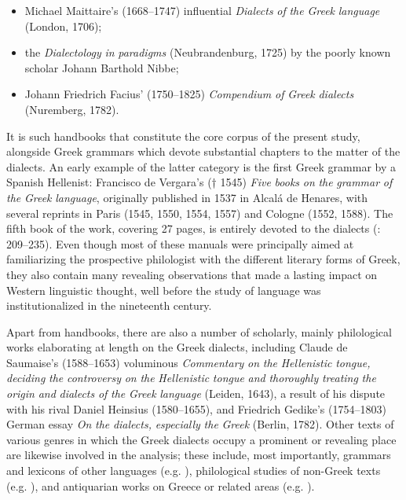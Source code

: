 \begin{itemize}
\begin{styleListParagraph}
\end{styleListParagraph}
\item \begin{styleListParagraph}
Michael Maittaire’s (1668–1747) influential \textit{Dialects} \textit{of} \textit{the} \textit{Greek} \textit{language} (London, 1706);
\end{styleListParagraph}
\item \begin{styleListParagraph}
the \textit{Dialectology} \textit{in} \textit{paradigms} (Neubrandenburg, 1725) by the poorly known scholar Johann Barthold Nibbe;
\end{styleListParagraph}
\item \begin{styleListParagraph}
Johann Friedrich Facius’ (1750–1825) \textit{Compendium} \textit{of} \textit{Greek} \textit{dialects} (Nuremberg, 1782).
\end{styleListParagraph}
\end{itemize}

It is such handbooks that constitute the core corpus of the present study, alongside Greek grammars which devote substantial chapters to the matter of the dialects. An early example of the latter category is the first Greek grammar by a Spanish Hellenist: Francisco de Vergara’s († 1545) \textit{Five} \textit{books} \textit{on} \textit{the} \textit{grammar} \textit{of} \textit{the} \textit{Greek} \textit{language}, originally published in 1537 in Alcalá de Henares, with several reprints in Paris (1545, 1550, 1554, 1557) and Cologne (1552, 1588). The fifth book of the work, covering 27 pages, is entirely devoted to the dialects (\citealt{Vergara1537}: 209–235). Even though most of these manuals were principally aimed at familiarizing the prospective philologist with the different literary forms of Greek, they also contain many revealing observations that made a lasting impact on Western linguistic thought, well before the study of language was institutionalized in the nineteenth century.

Apart from handbooks, there are also a number of scholarly, mainly philological works elaborating at length on the Greek dialects, including Claude de Saumaise’s (1588–1653) voluminous \textit{Commentary} \textit{on} \textit{the} \textit{Hellenistic} \textit{tongue,} \textit{deciding} \textit{the} \textit{controversy} \textit{on} \textit{the} \textit{Hellenistic} \textit{tongue} \textit{and} \textit{thoroughly} \textit{treating} \textit{the} \textit{origin} \textit{and} \textit{dialects} \textit{of} \textit{the} \textit{Greek} \textit{language} (Leiden, 1643), a result of his dispute with his rival Daniel Heinsius (1580–1655), and Friedrich Gedike’s (1754–1803) German essay \textit{On} \textit{the} \textit{dialects,} \textit{especially} \textit{the} \textit{Greek} (Berlin, 1782). Other texts of various genres in which the Greek dialects occupy a prominent or revealing place are likewise involved in the analysis; these include, most importantly, grammars and lexicons of other languages (e.g. \citealt{Gill1619}), philological studies of non-Greek texts (e.g. \citealt{Schultens1748}), and antiquarian works on Greece or related areas (e.g. \citealt{Castelli1769}).

